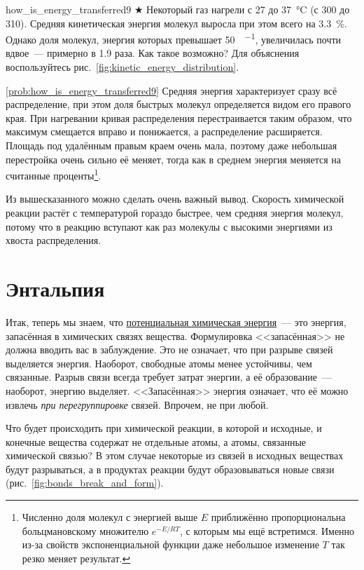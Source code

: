 \begin{problem}{}{how_is_energy_transferred9}
    $\bigstar$ Некоторый газ нагрели с \num{27} до \qty{37}{\degreeCelsius} (с \num{300} до \qty{310}{\ruK}). Средняя кинетическая энергия молекул выросла при этом всего на \qty{3,3}{\percent}. Однако доля молекул, энергия которых превышает \qty{50}{\ruKJ\per\ruMole}, увеличилась почти вдвое~--- примерно в \num{1,9} раза. Как такое возможно? Для объяснения воспользуйтесь рис.~\ref{fig:kinetic_energy_distribution}.
    \begin{sol}{\ref{prob:how_is_energy_transferred9}}
        Средняя энергия характеризует сразу всё распределение, при этом доля быстрых молекул определяется видом его правого края. При нагревании кривая распределения перестраивается таким образом, что максимум смещается вправо и понижается, а распределение расширяется. Площадь под удалённым правым краем очень мала, поэтому даже небольшая перестройка очень сильно её меняет, тогда как в среднем энергия меняется на считанные проценты\footnote{Численно доля молекул с энергией выше $E$ приближённо пропорциональна больцмановскому множителю $e^{-E/RT}$, с которым мы ещё встретимся. Именно из-за свойств экспоненциальной функции даже небольшое изменение $T$ так резко меняет результат.}.

        Из вышесказанного можно сделать очень важный вывод. Скорость химической реакции растёт с температурой гораздо быстрее, чем средняя энергия молекул, потому что в реакцию вступают как раз молекулы с высокими энергиями из хвоста распределения.
    \end{sol}
\end{problem}

\clearpage

\section{Энтальпия}

Итак, теперь мы знаем, что \hyperref[sec:potential-chemical-energy]{потенциальная химическая энергия}~--- это энергия, запасённая в химических связях вещества. Формулировка <<запасённая>> не должна вводить вас в заблуждение. Это не означает, что при разрыве связей выделяется энергия. Наоборот, свободные атомы менее устойчивы, чем связанные. Разрыв связи всегда требует затрат энергии, а её образование~--- наоборот, энергию выделяет. <<Запасённая>> энергия означает, что её можно извлечь \textit{при перегруппировке} связей. Впрочем, не при любой.

Что будет происходить при химической реакции, в которой и исходные, и конечные вещества содержат не отдельные атомы, а атомы, связанные химической связью? В этом случае некоторые из связей в исходных веществах будут разрываться, а в продуктах реакции будут образовываться новые связи (рис.~\ref{fig:bonds_break_and_form}).

